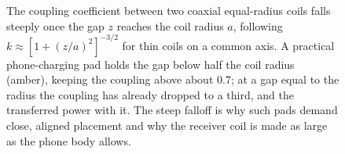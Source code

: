 \begin{figure}[htbp]
\centering
{}
\caption[Wireless-charging coupling against gap]{The coupling coefficient
between two coaxial equal-radius coils falls steeply once the gap $z$ reaches
the coil radius $a$, following $k\approx[1+(z/a)^2]^{-3/2}$ for thin coils on
a common axis. A practical phone-charging pad holds the gap below half the
coil radius (amber), keeping the coupling above about $0.7$; at a gap equal to
the radius the coupling has already dropped to a third, and the transferred
power with it. The steep falloff is why such pads demand close, aligned
placement and why the receiver coil is made as large as the phone body
allows.}
\label{fig:vol04ch08:wireless-charging}
\end{figure}
